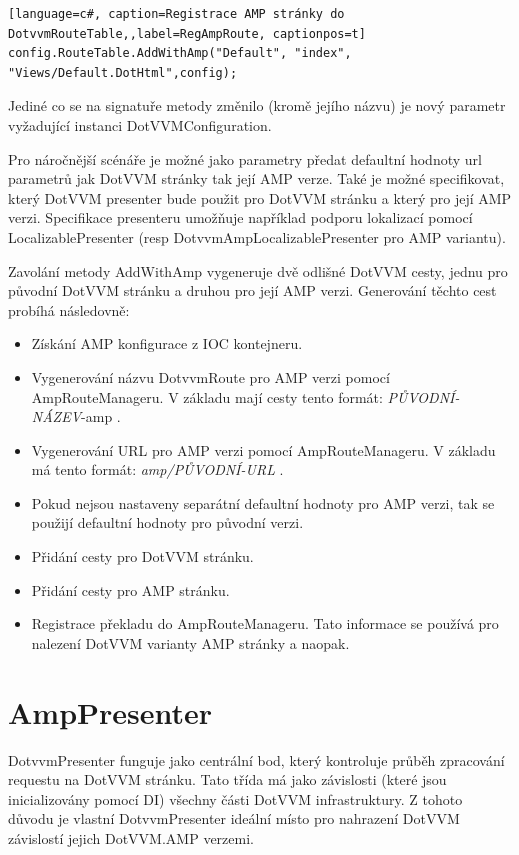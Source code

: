\begin{lstlisting}[language=c#, caption=Registrace AMP stránky do DotvvmRouteTable,,label=RegAmpRoute, captionpos=t]
config.RouteTable.AddWithAmp("Default", "index", "Views/Default.DotHtml",config);
\end{lstlisting}

Jediné co se na signatuře metody změnilo (kromě jejího názvu) je nový parametr vyžadující instanci DotVVMConfiguration.

Pro náročnější scénáře je možné jako parametry předat defaultní hodnoty url parametrů jak DotVVM stránky tak její AMP verze. Také je možné specifikovat, který DotVVM presenter bude použit pro DotVVM stránku a který pro její AMP verzi. Specifikace presenteru umožňuje například podporu lokalizací pomocí LocalizablePresenter (resp DotvvmAmpLocalizablePresenter pro AMP variantu).

Zavolání metody AddWithAmp vygeneruje dvě odlišné DotVVM cesty, jednu pro původní DotVVM stránku a druhou pro její AMP verzi.\newline
Generování těchto cest probíhá následovně:
\begin{itemize}
    \item Získání AMP konfigurace z IOC kontejneru.
    \item Vygenerování názvu  DotvvmRoute pro AMP verzi pomocí AmpRouteManageru.\newline
    V základu mají cesty tento formát: \textit{PŮVODNÍ-NÁZEV}-amp .
    \item Vygenerování URL  pro AMP verzi pomocí AmpRouteManageru.\newline
    V základu má tento formát: \textit{amp/PŮVODNÍ-URL} .
    \item Pokud nejsou nastaveny separátní defaultní hodnoty pro AMP verzi, tak se použijí defaultní hodnoty pro původní verzi.
    \item Přidání cesty pro DotVVM stránku.
    \item Přidání cesty pro AMP stránku.
    \item Registrace překladu do AmpRouteManageru.\newline
    Tato informace se používá pro nalezení DotVVM varianty AMP stránky a naopak.
\end{itemize}

\section{AmpPresenter}
DotvvmPresenter funguje jako centrální bod, který kontroluje průběh zpracování requestu na DotVVM stránku. Tato třída má jako závislosti (které jsou inicializovány pomocí DI) všechny části DotVVM infrastruktury. Z tohoto důvodu je vlastní DotvvmPresenter ideální místo pro nahrazení DotVVM závislostí jejich DotVVM.AMP verzemi.

